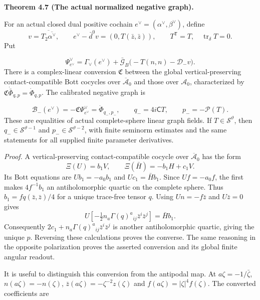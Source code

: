 \documentclass[
  english,
  11pt,
  reqno]{amsart}
\makeatletter
\newcommand{\pandocstatementheading}[1]{%
  \par\addpenalty{\@beginparpenalty}%
  \addvspace{.5\baselineskip plus .2\baselineskip minus .2\baselineskip}%
  {\normalfont\bfseries #1\par}%
  \nobreak\@afterindenttrue\@afterheading
}
\makeatother
\begin{document}
\pandocstatementheading{\leavevmode{}\label{thm:online-actual-linear-contact-graph}Theorem 4.7 (The actual normalized negative graph).}

For an actual closed dual positive cochain
\(e^\vee=(\alpha^\vee,\beta^\vee)\), define \[
v=\overline{T_2\overline{\alpha^\vee}},\qquad
e^\vee-\bar d^0v=(0,T(\bar z,\bar z)),\qquad
T^{\mathsf T}=T,\quad\operatorname{tr}_\delta T=0.
\] Put

\label{eq:online-dual-complete-sky-normalization} \[
\Psi^\vee_{e^\vee}
=\Gamma_\vee(e^\vee)
 +\bar{\mathcal G}_B\bigl(-T(n,n)-\mathcal D_-v\bigr).
\] There is a complex-linear conversion \(\mathfrak C\) between the
global vertical-preserving contact-compatible Bott cocycles over
\(\overline{\mathcal A}_0\) and those over \(\mathcal A_0\),
characterized by \(\mathfrak C\dot{\bar\Phi}_{q,p}=\dot\Phi_{q,p}\). The
calibrated negative graph is

\label{eq:online-negative-normalized-graph} \[
\mathcal B_-(e^\vee)
=-\mathfrak C\Psi^\vee_{e^\vee}
=\dot\Phi_{q_-,p_-},\qquad
q_-=4i\mathsf CT,\qquad p_-=-\mathcal P(T).
\] These are equalities of actual complete-sphere linear graph fields.
If \(T\in\mathscr S^\vartheta\), then \(q_-\in\mathscr S^{\vartheta-1}\)
and \(p_-\in\mathscr S^{\vartheta-2}\), with finite seminorm estimates
and the same statements for all supplied finite parameter derivatives.

\emph{Proof.} A vertical-preserving contact-compatible cocycle over
\(\overline{\mathcal A}_0\) has the form \[
\Xi(U)=b_1V,\qquad \Xi(\bar H)=-b_1H+c_1V.
\] Its Bott equations are \(Ub_1=-a_0b_1\) and \(Uc_1=\bar H b_1\).
Since \(Uf=-a_0f\), the first makes \(4f^{-1}b_1\) an antiholomorphic
quartic on the complete sphere. Thus \(b_1=fq(\bar z,\bar z)/4\) for a
unique trace-free tensor \(q\). Using \(Un=-f\bar z\) and \(U\bar z=0\)
gives \[
U\left[-\tfrac12n_a\Gamma(q)^a{}_{ij}\bar z^i\bar z^j\right]
=\bar H b_1.
\] Consequently \(2c_1+n_a\Gamma(q)^a{}_{ij}\bar z^i\bar z^j\) is
another antiholomorphic quartic, giving the unique \(p\). Reversing
these calculations proves the converse. The same reasoning in the
opposite polarization proves the asserted conversion and its global
finite angular readout.

It is useful to distinguish this conversion from the antipodal map. At
\(a\zeta=-1/\bar\zeta\), \(n(a\zeta)=-n(\zeta)\),
\(\bar z(a\zeta)=-\zeta^{-2}z(\zeta)\) and
\(f(a\zeta)=|\zeta|^4f(\zeta)\). The converted coefficients are
\end{document}
